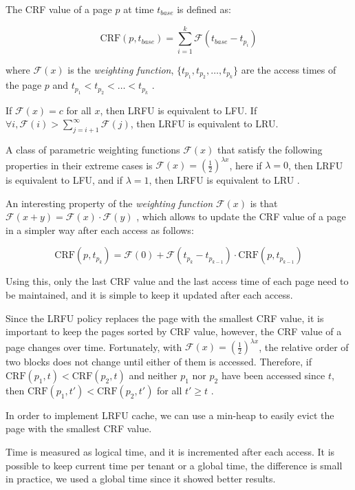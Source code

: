 The CRF value of a page $p$ at time $t_{base}$ is defined as:

$$
\text{CRF}(p, t_{base}) = \sum_{i = 1}^{k} \mathcal{F}(t_{base} - t_{p_i})
$$

where $\mathcal{F}(x)$ is the \textit{weighting function}, $\{ t_{p_1}, t_{p_2}, \ldots, t_{p_k} \}$ are the 
access times of the page $p$ and $t_{p_1} < t_{p_2} < \ldots < t_{p_k}$ \cite{lrfu-article}.

If $\mathcal{F}(x) = c$ for all $x$, then LRFU is equivalent to LFU. If 
$\forall i, \mathcal{F}(i) > \sum_{j = i + 1}^{\infty} \mathcal{F}(j)$, then LRFU is equivalent to LRU.

A class of parametric weighting functions $\mathcal{F}(x)$ that satisfy the following properties in 
their extreme cases is $\mathcal{F}(x) = (\frac{1}{2})^{\lambda x}$, here if $\lambda = 0$, then LRFU is
equivalent to LFU, and if $\lambda = 1$, then LRFU is equivalent to LRU \cite{lrfu-article}. 

An interesting property of the \textit{weighting function} $\mathcal{F}(x)$ is that 
$\mathcal{F}(x+y) = \mathcal{F}(x) \cdot \mathcal{F}(y)$ \cite{lrfu-article}, which allows to update the CRF value of a 
page in a simpler way after each access as follows:

$$
\text{CRF}(p, t_{p_k}) = \mathcal{F}(0) + \mathcal{F}(t_{p_k} - t_{p_{k-1}}) \cdot \text{CRF}(p, t_{p_{k-1}})
$$

Using this, only the last CRF value and the last access time of each page need to be maintained, and it 
is simple to keep it updated after each access.

Since the LRFU policy replaces the page with the smallest CRF value, it is important to keep the pages 
sorted by CRF value, however, the CRF value of a page changes over time. Fortunately, with 
$\mathcal{F}(x) = (\frac{1}{2})^{\lambda x}$, the relative order of two blocks does not change until 
either of them is accessed. Therefore, if $\text{CRF}(p_1, t) < \text{CRF}(p_2, t)$ and neither 
$p_1$ nor $p_2$ have been accessed since $t$, then $\text{CRF}(p_1, t') < \text{CRF}(p_2, t')$
for all $t' \geq t$ \cite{lrfu-article}.

In order to implement LRFU cache, we can use a min-heap to easily evict the page with the smallest 
CRF value.

Time is measured as logical time, and it is incremented after each access. It is possible to keep 
current time per tenant or a global time, the difference is small in practice, we used a global time 
since it showed better results.

